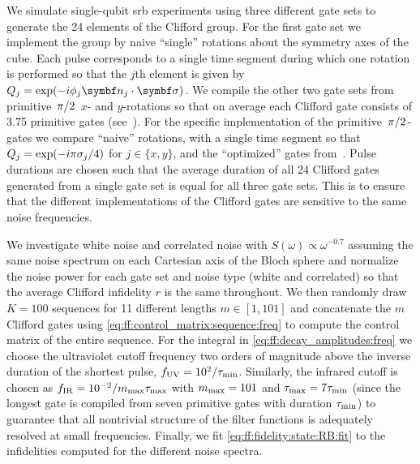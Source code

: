 We simulate single-qubit \gls{srb} experiments using three different gate sets to generate the 24 elements of the Clifford group.
For the first gate set we implement the group by naive \enquote{single} rotations about the symmetry axes of the cube.
Each pulse corresponds to a single time segment during which one rotation is performed so that the $j$th element is given by $Q_j = \exp(-\i\phi_j\bvec{n}_j\cdot\bvec{\sigma})$.
We compile the other two gate sets from primitive $\flatfrac{\pi}{2}$ $x$- and $y$-rotations so that on average each Clifford gate consists of \num{3.75} primitive gates (see~).
For the specific implementation of the primitive $\flatfrac{\pi}{2}$-gates we compare \enquote{naive} rotations, \ie with a single time segment so that $Q_j = \exp(-i\pi\sigma_j/4)$ for $j\in\lbrace x, y\rbrace$, and the \enquote{optimized} gates from~.
Pulse durations are chosen such that the average duration of all 24 Clifford gates generated from a single gate set is equal for all three gate sets.
This is to ensure that the different implementations of the Clifford gates are sensitive to the same noise frequencies.

We investigate white noise and correlated noise with $S(\omega)\propto\omega^{-0.7}$ assuming the same noise spectrum on each Cartesian axis of the Bloch sphere and normalize the noise power for each gate set and noise type (white and correlated) so that the average Clifford infidelity $r$ is the same throughout.
We then randomly draw $K = \num{100}$ sequences for \num{11} different lengths $m\in[1, 101]$ and concatenate the $m$ Clifford gates using \cref{eq:ff:control_matrix:sequence:freq} to compute the control matrix of the entire sequence.
For the integral in \cref{eq:ff:decay_amplitudes:freq} we choose the ultraviolet cutoff frequency two orders of magnitude above the inverse duration of the shortest pulse, $f_{\mathrm{UV}} = 10^2/\tau_{\mathrm{min}}$.
Similarly, the infrared cutoff is chosen as $f_{\mathrm{IR}} = 10^{-2}/m_{\mathrm{max}}\tau_{\mathrm{max}}$ with $m_{\mathrm{max}} = 101$ and $\tau_{\mathrm{max}} = 7\tau_{\mathrm{min}}$ (since the longest gate is compiled from seven primitive gates with duration $\tau_{\mathrm{min}}$) to guarantee that all nontrivial structure of the filter functions is adequately resolved at small frequencies.
Finally, we fit \cref{eq:ff:fidelity:state:RB:fit} to the infidelities computed for the different noise spectra.

